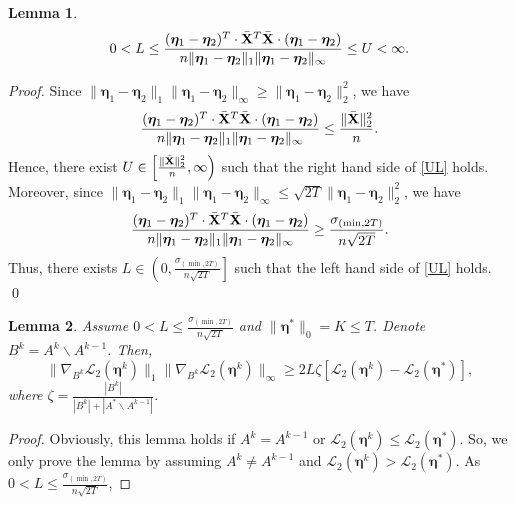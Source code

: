 \documentclass[12pt]{article}
\newtheorem{lemma}{Lemma}
\newcommand{\bX}{{\bf X}}
\newcommand{\boldeta}{\boldsymbol{\eta}}
\begin{document}
\begin{appendix}
\begin{lemma}
\begin{equation}\label{UL}
0<L\leq\frac{(\boldeta_{1}-\boldeta_{2})^{T}\cdot\bar{\bX}^T\bar{\bX}\cdot(\boldeta_{1}-\boldeta_{2})}{n\|\boldeta_{1}-\boldeta_{2}\|_1\|\boldeta_{1}-\boldeta_{2}\|_{\infty}}\leq U<\infty.
\end{equation}
\end{lemma}
\begin{proof}
Since $\|\boldeta_{1}-\boldeta_{2}\|_1\|\boldeta_{1}-\boldeta_{2}\|_{\infty}\geq\|\boldeta_{1}-\boldeta_{2}\|_2^2$,
we have
\begin{equation*}
\frac{(\boldeta_{1}-\boldeta_{2})^{T}\cdot\bar{\bX}^T\bar{\bX}\cdot(\boldeta_{1}-\boldeta_{2})}{n\|\boldeta_{1}-\boldeta_{2}\|_1\|\boldeta_{1}-\boldeta_{2}\|_{\infty}}\leq\frac{\|\bar{\bX}\|^2_2}{n}.
\end{equation*}
Hence, there exist $U\in \left[\frac{\|\bar{\bX}\|_2^2}{n},\infty\right)$ such that the right hand side of \eqref{UL} holds.
Moreover, since $\|\boldeta_{1}-\boldeta_{2}\|_1\|\boldeta_{1}-\boldeta_{2}\|_{\infty}\leq\sqrt{2T}\|\boldeta_{1}-\boldeta_{2}\|_2^2$,
we have
\begin{equation*}
\frac{(\boldeta_{1}-\boldeta_{2})^{T}\cdot\bar{\bX}^T\bar{\bX}\cdot(\boldeta_{1}-\boldeta_{2})}{n\|\boldeta_{1}-\boldeta_{2}\|_1\|\boldeta_{1}-\boldeta_{2}\|_{\infty}}\geq\frac{\sigma_{(\min,2T)}}{n\sqrt{2T}}.
\end{equation*}
Thus, there exists $L \in \left(0,\frac{\sigma_{(\min,2T)}}{n\sqrt{2T}}\right]$
such that the left hand side of \eqref{UL} holds.
\qed
\end{proof}
\begin{lemma}\label{L9.1}
Assume $0<L\leq\frac{\sigma_{(\min,2T)}}{n\sqrt{2T}}$ and $\|\boldeta^{*}\|_{0}=K\leq T$. Denote $B^k = A^{k}\backslash A^{k-1}$. Then,
\begin{equation*}
\|\nabla_{B^k}\mathcal{L}_2(\boldeta^{k})\|_1\|\nabla_{B^k}\mathcal{L}_2(\boldeta^{k})\|_{\infty}\geq 2L\zeta[\mathcal{L}_2(\boldeta^k)-\mathcal{L}_2(\boldeta^*)],
\end{equation*}
where $\zeta=\frac{|B^k|}{|B^k|+|A^*\backslash A^{k-1}|}$.
\end{lemma}
\begin{proof}
Obviously, this lemma holds if $A^{k}=A^{k-1}$ or $\mathcal{L}_2(\boldeta^k)\leq \mathcal{L}_2(\boldeta^*)$. So, we only prove the lemma by assuming $A^{k}\neq A^{k-1}$ and $\mathcal{L}_2(\boldeta^k)>\mathcal{L}_2(\boldeta^*)$. As $0<L\leq\frac{\sigma_{(\min,2T)}}{n\sqrt{2T}}$,

\end{proof}
\end{appendix}
\end{document}
